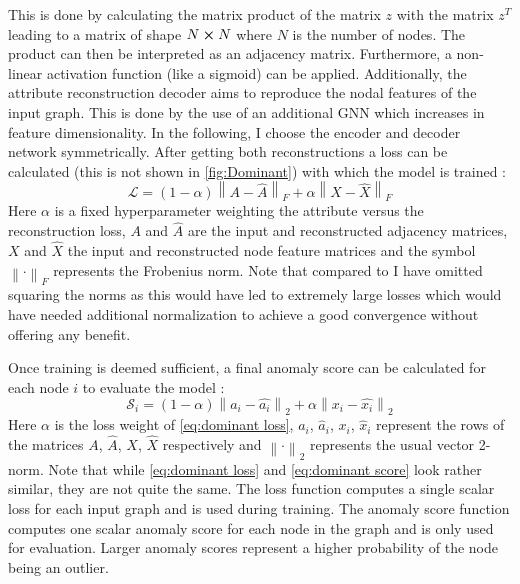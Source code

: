 \documentclass[11pt,a4paper]{article}
\begin{document}
This is done by calculating the matrix product of the matrix $z$ with the matrix $z^T$ leading to a matrix of shape $N\cross N$ where $N$ is the number of nodes. 
The product can then be interpreted as an adjacency matrix. 
Furthermore, a non-linear activation function (like a sigmoid) can be applied. 
Additionally, the attribute reconstruction decoder aims to reproduce the nodal features of the input graph. 
This is done by the use of an additional GNN which increases in feature dimensionality. 
In the following, I choose the encoder and decoder network symmetrically. 
After getting both reconstructions a loss can be calculated (this is not shown in \autoref{fig:Dominant}) with which the model is trained \cite{dingDeepAnomalyDetection2019}:
\begin{equation}
\label{eq:dominant loss}
\mathcal{L} = (1-\alpha) \left\lVert A-\hat{A} \right\rVert _F + \alpha \left\lVert X-\hat{X} \right\rVert _F
\end{equation}
Here $\alpha$ is a fixed hyperparameter weighting the attribute versus the reconstruction loss, $A$ and $\hat{A}$ are the input and reconstructed adjacency matrices, $X$ and $\hat{X}$ the input and reconstructed node feature matrices and the symbol $\left\lVert\cdot \right\rVert _F$ represents the Frobenius norm. 
Note that compared to \cite{dingDeepAnomalyDetection2019} I have omitted squaring the norms as this would have led to extremely large losses which would have needed additional normalization to achieve a good convergence without offering any benefit. 

Once training is deemed sufficient, a final anomaly score can be calculated for each node $i$ to evaluate the model \cite{dingDeepAnomalyDetection2019}:
\begin{equation}
\label{eq:dominant score}
\mathcal{S}_i = (1-\alpha) \left\lVert a_i-\hat{a_i} \right\rVert _2 + \alpha \left\lVert x_i-\hat{x_i} \right\rVert _2
\end{equation}
Here $\alpha$ is the loss weight of \autoref{eq:dominant loss}, $a_i$, $\hat{a}_i$, $x_i$, $\hat{x}_i$ represent the rows of the matrices $A$, $\hat{A}$, $X$, $\hat{X}$ respectively and $\left\lVert\cdot \right\rVert _2$ represents the usual vector 2-norm. 
Note that while \autoref{eq:dominant loss} and \autoref{eq:dominant score} look rather similar, they are not quite the same. 
The loss function computes a single scalar loss for each input graph and is used during training. 
The anomaly score function computes one scalar anomaly score for each node in the graph and is only used for evaluation. 
Larger anomaly scores represent a higher probability of the node being an outlier. \\
\end{document}
